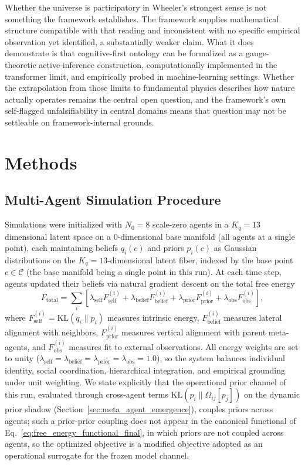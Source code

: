 \documentclass[11pt]{article}
\begin{document}
Whether the universe is participatory in Wheeler's strongest sense is not something the framework establishes. The framework supplies mathematical structure compatible with that reading and inconsistent with no specific empirical observation yet identified, a substantially weaker claim. What it does demonstrate is that cognitive-first ontology can be formalized as a gauge-theoretic active-inference construction, computationally implemented in the transformer limit, and empirically probed in machine-learning settings. Whether the extrapolation from those limits to fundamental physics describes how nature actually operates remains the central open question, and the framework's own self-flagged unfalsifiability in central domains means that question may not be settleable on framework-internal grounds.

\section{Methods}
\label{sec:methods}

\subsection{Multi-Agent Simulation Procedure}
\label{sec:methods_metagent}

Simulations were initialized with $N_0 = 8$ scale-zero agents in a $K_q=13$ dimensional latent space on a 0-dimensional base manifold (all agents at a single point), each maintaining beliefs $q_i(c)$ and priors $p_i(c)$ as Gaussian distributions on the $K_q = 13$-dimensional latent fiber, indexed by the base point $c \in \mathcal{C}$ (the base manifold being a single point in this run). At each time step, agents updated their beliefs via natural gradient descent on the total free energy
\begin{equation}
F_{\text{total}} = \sum_i \left[ \lambda_{\text{self}} F_{\text{self}}^{(i)} + \lambda_{\text{belief}} F_{\text{belief}}^{(i)} + \lambda_{\text{prior}} F_{\text{prior}}^{(i)} + \lambda_{\text{obs}} F_{\text{obs}}^{(i)} \right],
\end{equation}
where $F_{\text{self}}^{(i)} = \mathrm{KL}(q_i \| p_i)$ measures intrinsic energy, $F_{\text{belief}}^{(i)}$ measures lateral alignment with neighbors, $F_{\text{prior}}^{(i)}$ measures vertical alignment with parent meta-agents, and $F_{\text{obs}}^{(i)}$ measures fit to external observations. All energy weights are set to unity ($\lambda_{\text{self}} = \lambda_{\text{belief}} = \lambda_{\text{prior}} = \lambda_{\text{obs}} = 1.0$), so the system balances individual identity, social coordination, hierarchical integration, and empirical grounding under unit weighting. We state explicitly that the operational prior channel of this run, evaluated through cross-agent terms $\mathrm{KL}(p_i \| \Omega_{ij}[p_j])$ on the dynamic prior shadow (Section~\ref{sec:meta_agent_emergence}), couples priors across agents; such a prior-prior coupling does not appear in the canonical functional of Eq.~\eqref{eq:free_energy_functional_final}, in which priors are not coupled across agents, so the optimized objective is a modified objective adopted as an operational surrogate for the frozen model channel.
\end{document}
